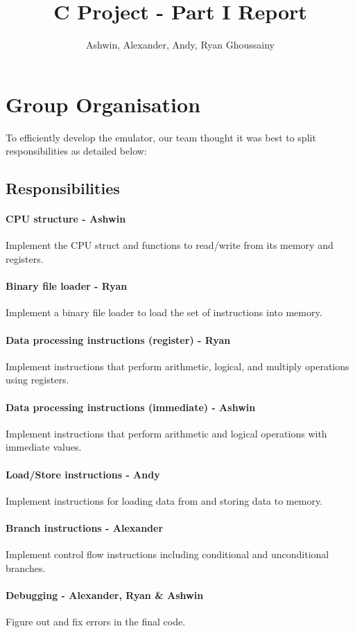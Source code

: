 \documentclass[a4paper, 10pt]{article}
\title{C Project - Part I Report}
\author{Ashwin, Alexander, Andy, Ryan Ghoussainy}
\begin{document}
\date{}

\maketitle

\section{Group Organisation}

To efficiently develop the emulator, our team thought it was best to split responsibilities as detailed below:
\subsection{Responsibilities}

\paragraph{CPU structure - Ashwin} Implement the CPU struct and functions to read/write from its memory and registers.
\paragraph{Binary file loader - Ryan} Implement a binary file loader to load the set of instructions into memory.
\paragraph{Data processing instructions (register) - Ryan} Implement instructions that perform arithmetic, logical, and multiply operations using registers.
\paragraph{Data processing instructions (immediate) - Ashwin} Implement instructions that perform arithmetic and logical operations with immediate values.
\paragraph{Load/Store instructions - Andy} Implement instructions for loading data from and storing data to memory.
\paragraph{Branch instructions - Alexander} Implement control flow instructions including conditional and unconditional branches.
\paragraph{Debugging - Alexander, Ryan \& Ashwin} Figure out and fix errors in the final code.
\end{document}
